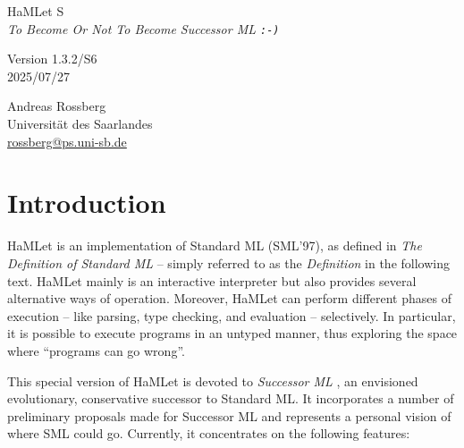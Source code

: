 \documentclass[twoside,titlepage]{article}
\begin{document}

\begin{titlepage}
\begin{center}

\vspace*{5cm}
{\Huge HaMLet S} \\
\vspace{5mm}
{\large\it To Become Or Not To Become Successor ML {\tt:-)}} \\
\vspace{1cm}

\vspace{1cm}
Version 1.3.2/S6 \\
2025/07/27

\vspace{3cm}
\large
Andreas Rossberg \\
Universit\"at des Saarlandes \\
\url{rossberg@ps.uni-sb.de}

\end{center}
\end{titlepage}


{
\setlength{\parskip}{0.5ex}
\tableofcontents
}

\vfill
\pagebreak


\section{Introduction}
\label{intro}

HaMLet is an implementation of Standard ML (SML'97), as defined in {\it The Definition of Standard ML} \cite{definition} -- simply referred to as the {\em Definition} in the following text. HaMLet mainly is an interactive interpreter but also provides several alternative ways of operation. Moreover, HaMLet can perform different phases of execution -- like parsing, type checking, and evaluation -- selectively. In particular, it is possible to execute programs in an untyped manner, thus exploring the space where ``programs can go wrong''.

This special version of HaMLet is devoted to {\em Successor ML} \cite{successorml}, an envisioned evolutionary, conservative successor to Standard ML. It incorporates a number of preliminary proposals made for Successor ML and represents a personal vision of where SML could go. Currently, it concentrates on the following features:
\end{document}
